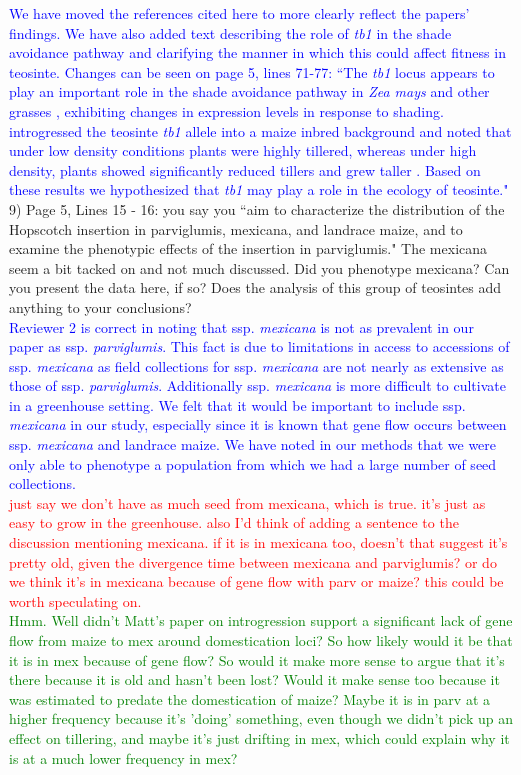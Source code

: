 \documentclass[11pt]{article}
\newcommand{\res}[1]{\noindent \textcolor{blue}{{#1}} \\}
\newcommand{\jri}[1]{\noindent \textcolor{red}{{#1}} \\}
\newcommand{\lev}[1]{\noindent \textcolor{green}{{#1}} \\}
\begin{document}
\res{We have moved the references cited here to more clearly reflect the papers' findings.  We have also added text describing the role of \emph{tb1} in the shade avoidance pathway and clarifying the manner in which this could affect fitness in teosinte. Changes can be seen on page 5, lines 71-77: ``The \emph{tb1} locus appears to play an important role in the shade avoidance pathway in \emph{Zea mays} \citep{LukensDoebley1999} and other grasses \citep{KebromBrutnell2007}, exhibiting changes in expression levels in response to shading. \citet{LukensDoebley1999} introgressed the teosinte \emph{tb1} allele into a maize inbred background and noted that under low density conditions plants were highly tillered, whereas under high density, plants showed significantly reduced tillers and grew taller \citep{LukensDoebley1999}. Based on these results we hypothesized that \emph{tb1} may play a role in the ecology of teosinte."}

9) Page 5, Lines 15 - 16: you say you ``aim to characterize the distribution of the Hopscotch insertion in parviglumis, mexicana, and landrace maize, and to examine the phenotypic effects of the insertion in parviglumis."  The mexicana seem a bit tacked on and not much discussed. Did you phenotype mexicana? Can you present the data here, if so? Does the analysis of this group of teosintes add anything to your conclusions?\\

\res{Reviewer 2 is correct in noting that ssp. \emph{mexicana} is not as prevalent in our paper as ssp. \emph{parviglumis}. This fact is due to limitations in access to accessions of ssp. \emph{mexicana} as field collections for ssp. \emph{mexicana} are not nearly as extensive as those of ssp. \emph{parviglumis}. Additionally ssp. \emph{mexicana} is more difficult to cultivate in a greenhouse setting. We felt that it would be important to include ssp. \emph{mexicana} in our study, especially since it is known that gene flow occurs between ssp. \emph{mexicana} and landrace maize. We have noted in our methods that we were only able to phenotype a population from which we had a large number of seed collections.} \jri{just say we don't have as much seed from mexicana, which is true. it's just as easy to grow in the greenhouse. also I'd think of adding a sentence to the discussion mentioning mexicana. if it is in mexicana too, doesn't that suggest it's pretty old, given the divergence time between mexicana and parviglumis? or do we think it's in mexicana because of gene flow with parv or maize? this could be worth speculating on.}
\lev{Hmm. Well didn't Matt's paper on introgression support a significant lack of gene flow from maize to mex around domestication loci? So how likely would it be that it is in mex because of gene flow? So would it make more sense to argue that it's there because it is old and hasn't been lost? Would it make sense too because it was estimated to predate the domestication of maize? Maybe it is in parv at a higher frequency because it's 'doing' something, even though we didn't pick up an effect on tillering, and maybe it's just drifting in mex, which could explain why it is at a much lower frequency in mex?}
\end{document}
